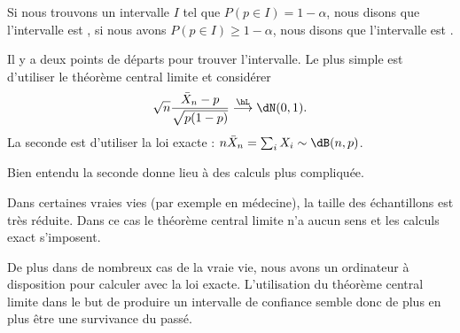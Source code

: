 Si nous trouvons un intervalle \( I\) tel que \( P(p\in I)=1-\alpha\), nous disons que l'intervalle est , si nous avons \( P(p\in I)\geq 1-\alpha\), nous disons que l'intervalle est .

Il y a deux points de départs pour trouver l'intervalle. Le plus simple est d'utiliser le théorème central limite et considérer
\begin{equation}
    \sqrt{n}\frac{ \bar X_n-p }{ \sqrt{p(1-p)} }\stackrel{\hL}{\longrightarrow}\dN(0,1).
\end{equation}
La seconde est d'utiliser la loi exacte : \( n\bar X_n=\sum_i X_i\sim \dB(n,p)\).

Bien entendu la seconde donne lieu à des calculs plus compliquée.

\begin{remark}
    Dans certaines vraies vies (par exemple en médecine), la taille des échantillons est très réduite. Dans ce cas le théorème central limite n'a aucun sens et les calculs exact s'imposent.

    De plus dans de nombreux cas de la vraie vie, nous avons un ordinateur à disposition pour calculer avec la loi exacte. L'utilisation du théorème central limite dans le but de produire un intervalle de confiance semble donc de plus en plus être une survivance du passé.
\end{remark}

